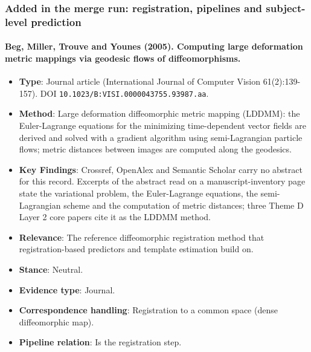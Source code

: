 \documentclass[journal,onecolumn]{IEEEtran}
\begin{document}
\subsubsection{Added in the merge run: registration, pipelines and subject-level prediction}

\paragraph{Beg, Miller, Trouve and Younes (2005). Computing large deformation metric mappings via geodesic flows of diffeomorphisms.~\cite{Beg2005Computing}}\mbox{}

\begin{itemize}

\item{} \textbf{Type}: Journal article (International Journal of Computer Vision 61(2):139-157). DOI \nolinkurl{10.1023/B:VISI.0000043755.93987.aa}.

\item{} \textbf{Method}: Large deformation diffeomorphic metric mapping (LDDMM): the Euler-Lagrange equations for the minimizing time-dependent vector fields are derived and solved with a gradient algorithm using semi-Lagrangian particle flows; metric distances between images are computed along the geodesics.

\item{} \textbf{Key Findings}: Crossref, OpenAlex and Semantic Scholar carry no abstract for this record. Excerpts of the abstract read on a manuscript-inventory page state the variational problem, the Euler-Lagrange equations, the semi-Lagrangian scheme and the computation of metric distances; three Theme D Layer 2 core papers cite it as the LDDMM method.

\item{} \textbf{Relevance}: The reference diffeomorphic registration method that registration-based predictors and template estimation build on.

\item{} \textbf{Stance}: Neutral.

\item{} \textbf{Evidence type}: Journal.

\item{} \textbf{Correspondence handling}: Registration to a common space (dense diffeomorphic map).

\item{} \textbf{Pipeline relation}: Is the registration step.


\end{itemize}
\end{document}
